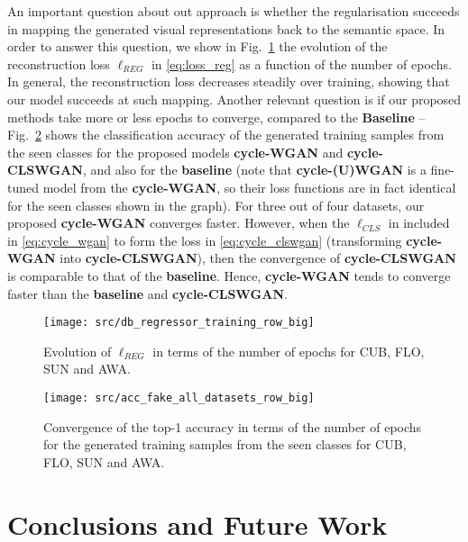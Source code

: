 \documentclass[runningheads]{llncs}
\begin{document}
An important question about out approach is whether the regularisation succeeds in mapping the generated visual representations back to the semantic space.  In order to answer this question, we show in Fig.~\ref{fig:sun_regressor} the evolution of the reconstruction loss $\ell_{REG}$ in \eqref{eq:loss_reg} as a function of the number of epochs.  In general, the reconstruction loss decreases steadily over training, showing that our model succeeds at such mapping.
Another relevant question is if our proposed methods take more or less epochs to converge, compared to the \textbf{Baseline} -- Fig.~\ref{fig:fake_acc} shows the classification accuracy of the generated training samples from the seen classes for the proposed models \textbf{cycle-WGAN} and \textbf{cycle-CLSWGAN}, and also for the \textbf{baseline} (note that \textbf{cycle-(U)WGAN} is a fine-tuned model from the \textbf{cycle-WGAN}, so their loss functions are in fact identical for the seen classes shown in the graph).  For three out of four datasets, our proposed \textbf{cycle-WGAN} converges faster. However, when the $\ell_{CLS}$ in included in \eqref{eq:cycle_wgan} to form the loss in \eqref{eq:cycle_clswgan} (transforming \textbf{cycle-WGAN} into \textbf{cycle-CLSWGAN}), then the convergence of \textbf{cycle-CLSWGAN} is comparable to that of the \textbf{baseline}.  Hence, \textbf{cycle-WGAN} tends to converge faster than the \textbf{baseline} and \textbf{cycle-CLSWGAN}.

\begin{figure}[t]
\centering
\texttt{[image: src/db\_regressor\_training\_row\_big]}
\caption{Evolution of $\ell_{REG}$ in terms of the number of epochs for CUB, FLO, SUN and AWA.}
\label{fig:sun_regressor}
\end{figure}

\begin{figure}[t]
\centering
	\texttt{[image: src/acc\_fake\_all\_datasets\_row\_big]}
 	\caption{Convergence of the top-1 accuracy in terms of the number of epochs for the generated training samples from the seen classes for CUB, FLO, SUN and AWA.}
    \label{fig:fake_acc}
\end{figure}



\section{Conclusions and Future Work}
\end{document}
